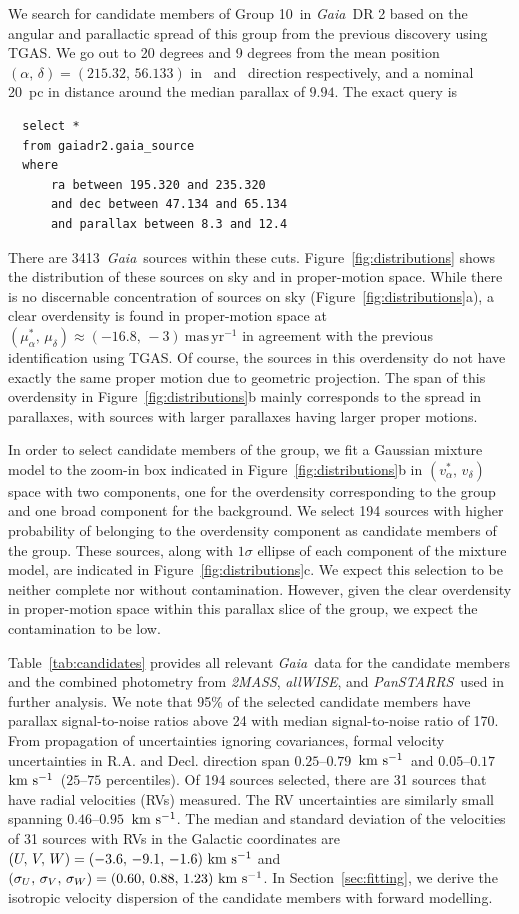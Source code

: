 \documentclass[modern,letterpaper]{aastex61}
\newcommand{\project}[1]{\textsl{#1}}
\newcommand{\acronym}[1]{{\small{#1}}}
\newcommand{\gaia}{\project{Gaia}}
\newcommand{\tmass}{\project{\acronym{2MASS}}}
\newcommand{\allwise}{\project{\acronym{allWISE}}}
\newcommand{\panstarrs}{\project{\acronym{PanSTARRS}}}
\newcommand{\sectionname}{Section}
\newcommand{\figname}{Figure}
\newcommand{\tgas}{\acronym{TGAS}}
\newcommand{\groupTen}{Group 10}
\newcommand{\kms}{\ensuremath{\rm km~s^{-1}}}
\newcommand{\ra}{\text{R.A.}}
\newcommand{\dec}{\text{Decl.}}
\newcommand{\pmra}{\ensuremath{\mu_\alpha^*}}
\newcommand{\pmdec}{\ensuremath{\mu_\delta}}
\newcommand{\masyr}{\ensuremath{\mathrm{mas}\,\mathrm{yr}^{-1}}}
\newcommand{\nstarsInRegion}{3413}
\begin{document}
We search for candidate members of \groupTen\ in \gaia\ DR 2
based on the angular and parallactic spread of this group from the previous
discovery using \tgas.
We go out to 20 degrees and 9 degrees from the mean position
$(\alpha,\,\delta) = (215.32,\,56.133)$
in \ra\ and \dec\ direction respectively,
and a nominal 20~pc in distance around the median parallax of $9.94$.
The exact query is
\begin{verbatim}
  select *
  from gaiadr2.gaia_source
  where
      ra between 195.320 and 235.320
      and dec between 47.134 and 65.134
      and parallax between 8.3 and 12.4
\end{verbatim}
There are \nstarsInRegion\ \gaia\ sources within these cuts.
Figure~\ref{fig:distributions} shows the distribution of these sources on sky
and in proper-motion space.
While there is no discernable concentration of sources on sky
(\figname~\ref{fig:distributions}a),
a clear overdensity is found in proper-motion space at
$(\pmra,\,\pmdec)\approx(-16.8,\,-3)~\masyr$ in agreement with the previous
identification using \tgas.
Of course, the sources in this overdensity do not have exactly the same proper
motion due to geometric projection.
The span of this overdensity in \figname~\ref{fig:distributions}b
mainly corresponds to the spread in parallaxes,
with sources with larger parallaxes having larger proper motions.

In order to select candidate members of the group,
we fit a Gaussian mixture model to the zoom-in box indicated in
\figname~\ref{fig:distributions}b in $(v_\alpha^*,\,v_\delta)$ space
with two components, one for the overdensity corresponding to the group and
one broad component for the background.
We select 194 sources with higher probability of belonging to the overdensity
component as candidate members of the group.
These sources, along with $1\sigma$ ellipse of each component of the mixture model,
are indicated in \figname~\ref{fig:distributions}c.
We expect this selection to be neither complete nor without contamination.
However, given the clear overdensity in proper-motion space within this parallax slice
of the group, we expect the contamination to be low.

Table~\ref{tab:candidates} provides all relevant \gaia\ data for the candidate members
and the combined photometry from \tmass, \allwise, and \panstarrs\
used in further analysis.
We note that 95\% of the selected candidate members have parallax
signal-to-noise ratios above 24 with median signal-to-noise ratio of 170.
From propagation of uncertainties ignoring covariances,
formal velocity uncertainties in R.A. and Decl. direction span
$0.25$--$0.79$~\kms\ and $0.05$--$0.17$~\kms\ ($25$--$75$ percentiles).
Of 194 sources selected, there are 31 sources that have radial velocities (RVs)
measured.
The RV uncertainties are similarly small spanning $0.46$--$0.95$~\kms.
The median and standard deviation of the velocities of 31 sources with RVs in
the Galactic coordinates are $(U,\,V,\,W) = (-3.6,\,-9.1,\,-1.6)~\kms$ and
$(\sigma_U,\,\sigma_V,\,\sigma_W) = (0.60,\,0.88,\,1.23)~\kms$.
In \sectionname~\ref{sec:fitting}, we derive
the isotropic velocity dispersion of the candidate members with
forward modelling.
\end{document}
